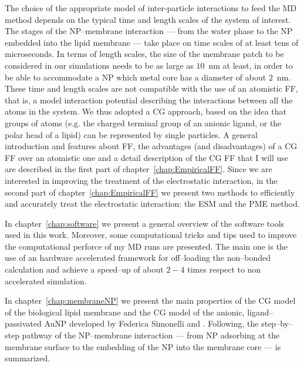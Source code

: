 
The choice of the appropriate model of inter-particle interactions to feed the \ac{MD} method depends on the typical time and length scales of the system of interest. The stages of the \ac{NP}--membrane interaction --- from the water phase to the \ac{NP} embedded into the lipid membrane  --- take place on time scales of at least tens of microseconds. In terms of length scales, the size of the membrane patch to be considered in our simulations needs to be as large as $10$~nm at least, in order to be able to accommodate a \ac{NP} which metal core has a diameter of about $2$~nm. These time and length scales are not compatible with the use of an atomistic \ac{FF}, that is, a model interaction potential describing the interactions between all the atoms in the system. We thus adopted a \ac{CG} approach, based on the idea that groups of atoms (e.g. the charged terminal group of an anionic ligand, or the polar head of a lipid) can be represented by single particles. A general introduction and features about \ac{FF}, the advantages (and disadvantages) of a \ac{CG} \ac{FF} over an atomistic one and a detail description of the \ac{CG} \ac{FF} that I will use are described in the first part of chapter~\ref{chap:EmpiricalFF}. Since we are interested in improving the treatment of the electrostatic interaction, in the second part of chapter~\ref{chap:EmpiricalFF} we present two methods to efficiently and accurately treat the electrostatic interaction: the \ac{ESM} and the \ac{PME} method.

In chapter~\ref{chap:software} we present a general overview of the software tools used in this work. Moreover, some computational tricks and tips used to improve the computational perforce of my \ac{MD} runs are presented. The main one is the use of an hardware accelerated framework for off--loading the non--bonded calculation and achieve a speed--up of about $2-4$ times respect to non accelerated simulation.

In chapter~\ref{chap:membraneNP} we present the main properties of the \ac{CG} model of the biological lipid membrane and the \ac{CG} model of the anionic, ligand--passivated \ac{AuNP} developed by Federica Simonelli \etal \cite{simonelliThesis} and \cite{ourPaper}. Following, the step--by--step pathway of the \ac{NP}--membrane interaction --- from \ac{NP} adsorbing at the membrane surface to the embedding of the \ac{NP} into the membrane core --- is summarized.

